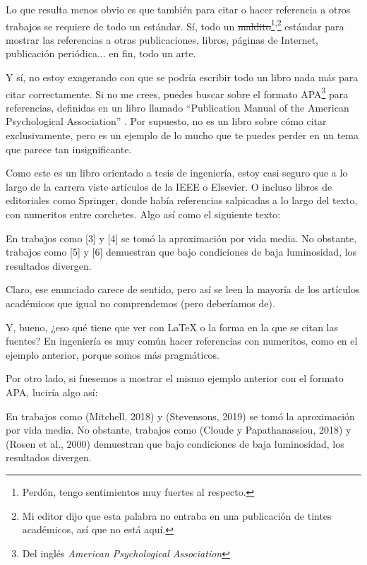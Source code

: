 Lo que resulta menos obvio es que también para citar o hacer referencia a otros trabajos se requiere de todo un estándar. Sí, todo un \st{maldito}\footnote{Perdón, tengo sentimientos muy fuertes al respecto.}\textsuperscript{,}\footnote{Mi editor dijo que esta palabra no entraba en una publicación de tintes académicos, así que no está aquí.} estándar para mostrar las referencias a otras publicaciones, libros, páginas de Internet, publicación periódica... en fin, todo un arte.

Y sí, no estoy exagerando con que se podría escribir todo un libro nada más para citar correctamente. Si no me crees, puedes buscar sobre el formato APA\footnote{Del inglés \emph{American Psychological Association}} para referencias, definidas en un libro llamado ``Publication Manual of the American Psychological Association'' \cite{bib:apa}. Por supuesto, no es un libro sobre cómo citar exclusivamente, pero es un ejemplo de lo mucho que te puedes perder en un tema que parece tan insignificante.

Como este es un libro orientado a tesis de ingeniería, estoy casi seguro que a lo largo de la carrera viste artículos de la IEEE o Elsevier. O incluso libros de editoriales como Springer, donde había referencias salpicadas a lo largo del texto, con numeritos entre corchetes. Algo así como el siguiente texto:

\begin{displayquote}
En trabajos como [3] y [4] se tomó la aproximación por vida media. No obstante, trabajos como [5] y [6] demuestran que bajo condiciones de baja luminosidad, los resultados divergen.
\end{displayquote}

Claro, ese enunciado carece de sentido, pero así se leen la mayoría de los artículos académicos que igual no comprendemos (pero deberíamos de).

Y, bueno, ¿eso qué tiene que ver con \LaTeX{} o la forma en la que se citan las fuentes? En ingeniería es muy común hacer referencias con numeritos, como en el ejemplo anterior, porque somos más pragmáticos.

Por otro lado, si fuesemos a mostrar el mismo ejemplo anterior con el formato APA, luciría algo así:

\begin{displayquote}
En trabajos como (Mitchell, 2018) y (Stevensons, 2019) se tomó la aproximación por vida media. No obstante, trabajos como (Cloude y Papathanassiou, 2018) y (Rosen et al., 2000) demuestran que bajo condiciones de baja luminosidad, los resultados divergen.
\end{displayquote}

